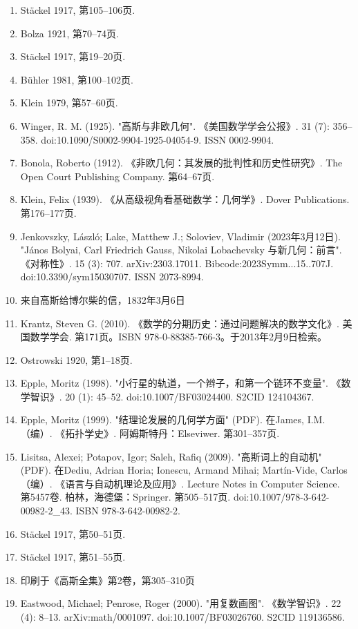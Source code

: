 \begin{enumerate}
\item Stäckel 1917, 第105–106页.  
\item Bolza 1921, 第70–74页.  
\item Stäckel 1917, 第19–20页.  
\item Bühler 1981, 第100–102页.  
\item Klein 1979, 第57–60页.
\item Winger, R. M. (1925). "高斯与非欧几何". 《美国数学学会公报》. 31 (7): 356–358. doi:10.1090/S0002-9904-1925-04054-9. ISSN 0002-9904.  
\item Bonola, Roberto (1912). 《非欧几何：其发展的批判性和历史性研究》. The Open Court Publishing Company. 第64–67页.  
\item Klein, Felix (1939). 《从高级视角看基础数学：几何学》. Dover Publications. 第176–177页.  
\item Jenkovszky, László; Lake, Matthew J.; Soloviev, Vladimir (2023年3月12日). "János Bolyai, Carl Friedrich Gauss, Nikolai Lobachevsky 与新几何：前言". 《对称性》. 15 (3): 707. arXiv:2303.17011. Bibcode:2023Symm...15..707J. doi:10.3390/sym15030707. ISSN 2073-8994.  
\item 来自高斯给博尔柴的信，1832年3月6日  
\item Krantz, Steven G. (2010). 《数学的分期历史：通过问题解决的数学文化》. 美国数学学会. 第171页。ISBN 978-0-88385-766-3。于2013年2月9日检索。  
\item Ostrowski 1920, 第1–18页.  
\item Epple, Moritz (1998). "小行星的轨道，一个辫子，和第一个链环不变量". 《数学智识》. 20 (1): 45–52. doi:10.1007/BF03024400. S2CID 124104367.  
\item Epple, Moritz (1999). "结理论发展的几何学方面" (PDF). 在James, I.M.（编）. 《拓扑学史》. 阿姆斯特丹：Elseviwer. 第301–357页.  
\item Lisitsa, Alexei; Potapov, Igor; Saleh, Rafiq (2009). "高斯词上的自动机" (PDF). 在Dediu, Adrian Horia; Ionescu, Armand Mihai; Martín-Vide, Carlos（编）. 《语言与自动机理论及应用》. Lecture Notes in Computer Science. 第5457卷. 柏林，海德堡：Springer. 第505–517页. doi:10.1007/978-3-642-00982-2_43. ISBN 978-3-642-00982-2.  
\item Stäckel 1917, 第50–51页.  
\item Stäckel 1917, 第51–55页.  
\item 印刷于《高斯全集》第2卷，第305–310页  
\item Eastwood, Michael; Penrose, Roger (2000). "用复数画图". 《数学智识》. 22 (4): 8–13. arXiv:math/0001097. doi:10.1007/BF03026760. S2CID 119136586.  

\end{enumerate}
